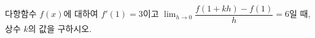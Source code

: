 다항함수 $f(x)$에 대하여 $f'(1)=3$이고 $\displaystyle\lim_{h\to 0}\dfrac{f(1+kh)-f(1)}{h}=6$일 때, 상수 $k$의 값을 구하시오.
